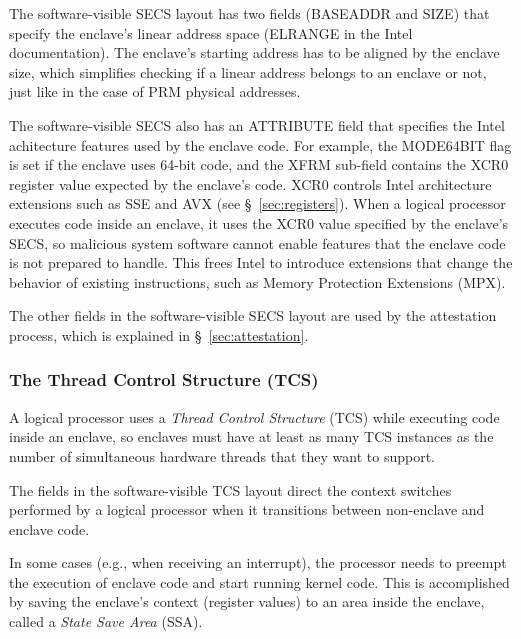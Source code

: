 The software-visible SECS layout has two fields (BASEADDR and SIZE) that
specify the enclave's linear address space (ELRANGE in the Intel
documentation). The enclave's starting address has to be aligned by the enclave
size, which simplifies checking if a linear address belongs to an enclave or
not, just like in the case of PRM physical addresses.


The software-visible SECS also has an ATTRIBUTE field that specifies the Intel
achitecture features used by the enclave code. For example, the MODE64BIT flag
is set if the enclave uses 64-bit code, and the XFRM sub-field contains the
XCR0 register value expected by the enclave's code. XCR0 controls Intel
architecture extensions such as SSE and AVX (see \S~\ref{sec:registers}). When
a logical processor executes code inside an enclave, it uses the XCR0 value
specified by the enclave's SECS, so malicious system software cannot enable
features that the enclave code is not prepared to handle. This frees Intel to
introduce extensions that change the behavior of existing instructions, such as
Memory Protection Extensions (MPX).

The other fields in the software-visible SECS layout are used by the
attestation process, which is explained in \S~\ref{sec:attestation}.

\subsubsection{The Thread Control Structure (TCS)}
\label{sec:tcs}


A logical processor uses a \textit{Thread Control Structure} (TCS) while
executing code inside an enclave, so enclaves must have at least as many TCS
instances as the number of simultaneous hardware threads that they want to
support.

The fields in the software-visible TCS layout direct the context switches
performed by a logical processor when it transitions between non-enclave and
enclave code.


In some cases (e.g., when receiving an interrupt), the processor needs to
preempt the execution of enclave code and start running kernel code. This is
accomplished by saving the enclave's context (register values) to an area
inside the enclave, called a \textit{State Save Area} (SSA).

